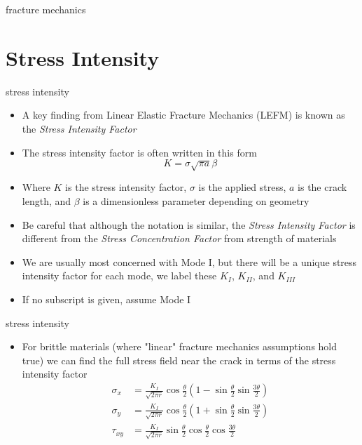 \documentclass[10pt]{beamer}
\begin{document}
\begin{frame}{fracture mechanics}
	\begin{figure}
	\def\svgwidth{\linewidth}
	
	\end{figure}
\end{frame}

\section{Stress Intensity}

\begin{frame}{stress intensity}
	\begin{itemize}
		\item A key finding from Linear Elastic Fracture Mechanics (LEFM) is known as the \emph{Stress Intensity Factor}
		\item The stress intensity factor is often written in this form
		\begin{equation*}
		K = \sigma\sqrt{\pi a} \beta
		\end{equation*}
		\item Where $K$ is the stress intensity factor, $\sigma$ is the applied stress, $a$ is the crack length, and $\beta$ is a dimensionless parameter depending on geometry
		\item Be careful that although the notation is similar, the \emph{Stress Intensity Factor} is different from the \emph{Stress Concentration Factor} from strength of materials
		\item We are usually most concerned with Mode I, but there will be a unique stress intensity factor for each mode, we label these $K_I$, $K_{II}$, and $K_{III}$
		\item If no subscript is given, assume Mode I
	\end{itemize}
\end{frame}

\begin{frame}{stress intensity}
	\begin{itemize}
		\item For brittle materials (where "linear" fracture mechanics assumptions hold true) we can find the full stress field near the crack in terms of the stress intensity factor
		\begin{align*}
		\sigma_x &= \frac{K_I}{\sqrt{2\pi r}} \cos \frac{\theta}{2} \left(1-\sin \frac{\theta}{2}\sin \frac{3\theta}{2}\right)\\
		\sigma_y &= \frac{K_I}{\sqrt{2\pi r}} \cos \frac{\theta}{2} \left(1+\sin \frac{\theta}{2}\sin \frac{3\theta}{2}\right)\\
		\tau_{xy} &= \frac{K_I}{\sqrt{2\pi r}} \sin \frac{\theta}{2} \cos \frac{\theta}{2}\cos \frac{3\theta}{2}
		\end{align*}
	\end{itemize}
\end{frame}
\end{document}

